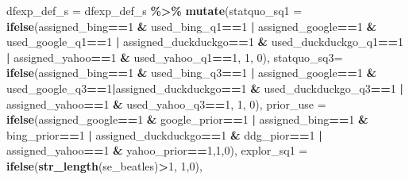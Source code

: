 \documentclass[
  11pt,
]{article}
\newenvironment{Shaded}{\begin{snugshade}}{\end{snugshade}}
\newcommand{\AttributeTok}[1]{\textcolor[rgb]{0.13,0.29,0.53}{#1}}
\newcommand{\DecValTok}[1]{\textcolor[rgb]{0.00,0.00,0.81}{#1}}
\newcommand{\FunctionTok}[1]{\textcolor[rgb]{0.13,0.29,0.53}{\textbf{#1}}}
\newcommand{\NormalTok}[1]{#1}
\newcommand{\OtherTok}[1]{\textcolor[rgb]{0.56,0.35,0.01}{#1}}
\newcommand{\SpecialCharTok}[1]{\textcolor[rgb]{0.81,0.36,0.00}{\textbf{#1}}}
\begin{document}
\begin{Shaded}
\begin{Highlighting}[]
\NormalTok{dfexp\_def\_s }\OtherTok{=}\NormalTok{ dfexp\_def\_s }\SpecialCharTok{\%\textgreater{}\%} 
  \FunctionTok{mutate}\NormalTok{(}\AttributeTok{statquo\_sq1 =} \FunctionTok{ifelse}\NormalTok{(assigned\_bing}\SpecialCharTok{==}\DecValTok{1} \SpecialCharTok{\&}\NormalTok{ used\_bing\_q1}\SpecialCharTok{==}\DecValTok{1} \SpecialCharTok{|}\NormalTok{ assigned\_google}\SpecialCharTok{==}\DecValTok{1} \SpecialCharTok{\&}\NormalTok{ used\_google\_q1}\SpecialCharTok{==}\DecValTok{1} \SpecialCharTok{|}\NormalTok{ assigned\_duckduckgo}\SpecialCharTok{==}\DecValTok{1} \SpecialCharTok{\&}\NormalTok{ used\_duckduckgo\_q1}\SpecialCharTok{==}\DecValTok{1} \SpecialCharTok{|}\NormalTok{ assigned\_yahoo}\SpecialCharTok{==}\DecValTok{1} \SpecialCharTok{\&}\NormalTok{ used\_yahoo\_q1}\SpecialCharTok{==}\DecValTok{1}\NormalTok{, }\DecValTok{1}\NormalTok{, }\DecValTok{0}\NormalTok{),}
         \AttributeTok{statquo\_sq3=} \FunctionTok{ifelse}\NormalTok{(assigned\_bing}\SpecialCharTok{==}\DecValTok{1} \SpecialCharTok{\&}\NormalTok{ used\_bing\_q3}\SpecialCharTok{==}\DecValTok{1} \SpecialCharTok{|}\NormalTok{ assigned\_google}\SpecialCharTok{==}\DecValTok{1} \SpecialCharTok{\&}\NormalTok{ used\_google\_q3}\SpecialCharTok{==}\DecValTok{1}\SpecialCharTok{|}\NormalTok{assigned\_duckduckgo}\SpecialCharTok{==}\DecValTok{1} \SpecialCharTok{\&}\NormalTok{ used\_duckduckgo\_q3}\SpecialCharTok{==}\DecValTok{1} \SpecialCharTok{|}\NormalTok{ assigned\_yahoo}\SpecialCharTok{==}\DecValTok{1} \SpecialCharTok{\&}\NormalTok{ used\_yahoo\_q3}\SpecialCharTok{==}\DecValTok{1}\NormalTok{, }\DecValTok{1}\NormalTok{, }\DecValTok{0}\NormalTok{),}
         \AttributeTok{prior\_use =} \FunctionTok{ifelse}\NormalTok{(assigned\_google}\SpecialCharTok{==}\DecValTok{1} \SpecialCharTok{\&}\NormalTok{ google\_prior}\SpecialCharTok{==}\DecValTok{1} \SpecialCharTok{|}\NormalTok{ assigned\_bing}\SpecialCharTok{==}\DecValTok{1} \SpecialCharTok{\&}\NormalTok{ bing\_prior}\SpecialCharTok{==}\DecValTok{1} \SpecialCharTok{|}\NormalTok{ assigned\_duckduckgo}\SpecialCharTok{==}\DecValTok{1} \SpecialCharTok{\&}\NormalTok{ ddg\_pior}\SpecialCharTok{==}\DecValTok{1} \SpecialCharTok{|}\NormalTok{ assigned\_yahoo}\SpecialCharTok{==}\DecValTok{1} \SpecialCharTok{\&}\NormalTok{ yahoo\_prior}\SpecialCharTok{==}\DecValTok{1}\NormalTok{,}\DecValTok{1}\NormalTok{,}\DecValTok{0}\NormalTok{),}
         \AttributeTok{explor\_sq1 =} \FunctionTok{ifelse}\NormalTok{(}\FunctionTok{str\_length}\NormalTok{(se\_beatles)}\SpecialCharTok{\textgreater{}}\DecValTok{1}\NormalTok{, }\DecValTok{1}\NormalTok{,}\DecValTok{0}\NormalTok{),}

\end{Highlighting}
\end{Shaded}
\end{document}
